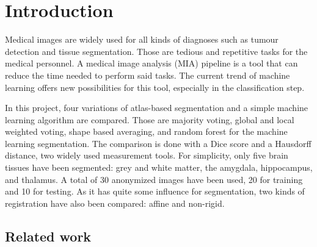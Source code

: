 \section*{Introduction}
Medical images are widely used for all kinds of diagnoses such as tumour detection and tissue segmentation. Those are tedious and repetitive tasks for the medical personnel. A medical image analysis (MIA) pipeline is a tool that can reduce the time needed to perform said tasks. The current trend of machine learning offers new possibilities for this tool, especially in the classification step.

In this project, four variations of atlas-based segmentation and a simple machine learning algorithm are compared. Those are majority voting, global and local weighted voting, shape based averaging, and random forest for the machine learning segmentation. The comparison is done with a Dice score and a Hausdorff distance, two widely used measurement tools. For simplicity, only five brain tissues have been segmented: grey and white matter, the amygdala, hippocampus, and thalamus. A total of 30 anonymized images have been used, 20 for training and 10 for testing. As it has quite some influence for segmentation, two kinds of registration have also been compared: affine and non-rigid.

\subsection*{Related work}